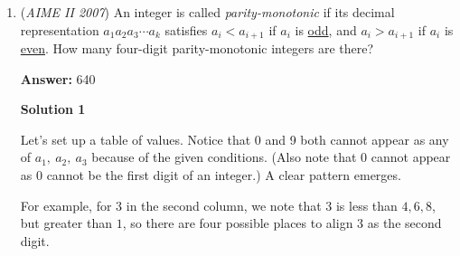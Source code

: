 \begin{enumerate}
 Do you see why we simply set $I$ as the answer as well? That's because every interior point, if moved down and left one (southwest direction), can have that point and the previous point create a unit square. For example, $(1, 1)$ moves to $(0, 0)$, so the square of points ${(0, 0), (1, 0), (1, 1), (0, 1)}$ is one example. This applies, of course, for $888$ points.

 



\textbf{Solution 4}

We know that the number of squares intersected in an $m\times{n}$ rectangle is $m + n -\mbox{gcd}(m,n)$. So if we apply that here, we get that the number of intersected squares is:

 $9 + 223 - 1 = 231$. 

 Now just subtract that from the total number of squares and divide by 2, since we want the number of squares below the line. 

 So,

 $\frac{2007 - 231}{2} = \frac{1776}{2} = \fbox{888}$



	\item (\textit{AIME II 2007}) An integer is called \textit{parity-monotonic} if its decimal representation $a_{1}a_{2}a_{3}\cdots a_{k}$ satisfies $a_{i}<a_{i+1}$ if $a_{i}$ is \href{https://artofproblemsolving.com/wiki/index.php?title=Odd}{odd}, and $a_{i}>a_{i+1}$ if $a_{i}$ is \href{https://artofproblemsolving.com/wiki/index.php?title=Even}{even}. How many four-digit parity-monotonic integers are there? 


 
 \textbf{Answer: }640



\textbf{Solution 1}

Let's set up a table of values. Notice that 0 and 9 both cannot appear as any of $a_1,\ a_2,\ a_3$ because of the given conditions. (Also note that 0 cannot appear as 0 cannot be the first digit of an integer.) A clear pattern emerges.

 For example, for $3$ in the second column, we note that $3$ is less than $4,6,8$, but greater than $1$, so there are four possible places to align $3$ as the second digit.


\end{enumerate}
